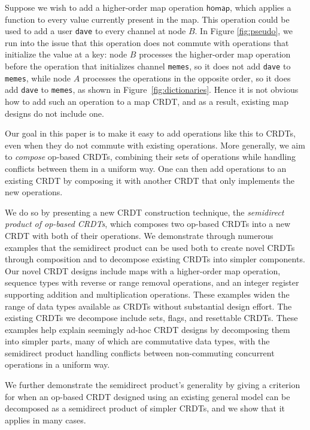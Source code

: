 \documentclass[acmsmall,nonacm]{acmart}
\newcommand{\msf}[1]{\ensuremath{\mathsf{#1}}}
\theoremstyle{plain}
\theoremstyle{definition}
\begin{document}
Suppose we wish to add a higher-order map operation $\msf{homap}$, which applies a function to every value currently present in the map. This operation could be used to add a user \texttt{dave} to every channel at node $B$.  In Figure \ref{fig:pseudo}, we run into the issue that this operation does not commute with operations that initialize the value at a key: node $B$ processes the higher-order map operation before the operation that initializes channel \texttt{memes}, so it does not add \texttt{dave} to \texttt{memes}, while node $A$ processes the operations in the opposite order, so it does add \texttt{dave} to \texttt{memes}, as shown in Figure~\ref{fig:dictionaries}.   Hence it is not obvious how to add such an operation to a map CRDT, and as a result, existing map designs do not include one.

Our goal in this paper is to make it easy to add operations like this to CRDTs, even when they do not commute with existing operations.  More generally, we aim to \textit{compose} op-based CRDTs, combining their sets of operations while handling conflicts between them in a uniform way.  One can then add operations to an existing CRDT by composing it with another CRDT that only implements the new operations.

We do so by presenting a new CRDT construction technique, the \textit{semidirect product of op-based CRDTs}, which composes two op-based CRDTs into a new CRDT with both of their operations.  We demonstrate through numerous examples that the semidirect product can be used both to create novel CRDTs through composition and to decompose existing CRDTs into simpler components.  Our novel CRDT designs include maps with a higher-order map operation, sequence types with reverse or range removal operations, and an integer register supporting addition and multiplication operations.  These examples widen the range of data types available as CRDTs without substantial design effort.  The existing CRDTs we decompose include sets, flags, and resettable CRDTs.  These examples help explain seemingly ad-hoc CRDT designs by decomposing them into simpler parts, many of which are commutative data types, with the semidirect product handling conflicts between non-commuting concurrent operations in a uniform way.

We further demonstrate the semidirect product's generality by giving a criterion for when an op-based CRDT designed using an existing general model \cite{pure_op_based_crdts_extended} can be decomposed as a semidirect product of simpler CRDTs, and we show that it applies in many cases.
\end{document}
